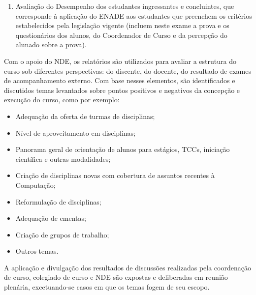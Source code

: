\begin{enumerate}
    \item Avaliação do Desempenho dos estudantes ingressantes e concluintes,
    que corresponde à aplicação do ENADE aos estudantes que preenchem os
    critérios estabelecidos pela legislação vigente (incluem neste exame a
    prova e os questionários dos alunos, do Coordenador de Curso e da percepção
    do alunado sobre a prova).
\end{enumerate}

Com o apoio do NDE, os relatórios são utilizados para avaliar a estrutura do
curso sob diferentes perspectivas: do discente, do docente, do resultado de
exames de acompanhamento externo. 
Com base nesses elementos, são identificados e discutidos temas levantados
sobre pontos positivos e negativos da concepção e execução do curso, como por
exemplo:
\begin{itemize}
    \item Adequação da oferta de turmas de disciplinas;
    \item Nível de aproveitamento em disciplinas;
    \item Panorama geral de orientação de alunos para estágios, TCCs, iniciação
    científica e outras modalidades;
    \item Criação de disciplinas novas com cobertura de assuntos recentes à
    Computação;
    \item Reformulação de disciplinas;
    \item Adequação de ementas;
    \item Criação de grupos de trabalho;
    \item Outros temas.
\end{itemize}

A aplicação e divulgação dos resultados de discussões realizadas pela
coordenação de curso, colegiado de curso e NDE são expostas e deliberadas em
reunião plenária, excetuando-se casos em que os temas fogem de seu escopo.
